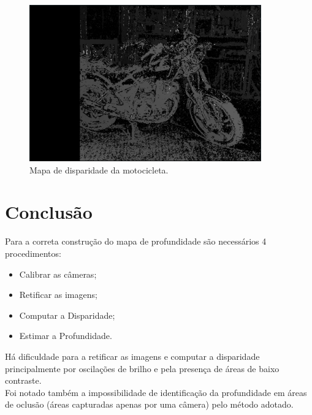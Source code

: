 \documentclass{bmvc2k}
\begin{document}
\begin{figure}[htp]
    \centering
    \includegraphics[width = 10cm]{Figs/DispMoto.png}
    \caption{Mapa de disparidade da motocicleta.}
    \label{fig:disp}
\end{figure}

\section{Conclusão}
Para a correta construção do mapa de profundidade são necessários 4 procedimentos:
\begin{itemize}
    \item Calibrar as câmeras;
    \item Retificar as imagens;
    \item Computar a Disparidade;
    \item Estimar a Profundidade.
\end{itemize}
Há dificuldade para a retificar as imagens e computar a disparidade principalmente por oscilações de brilho e pela presença de áreas de baixo contraste.\\
Foi notado também a impossibilidade de identificação da profundidade em áreas de oclusão (áreas capturadas apenas por uma câmera) pelo método adotado.



\end{document}
